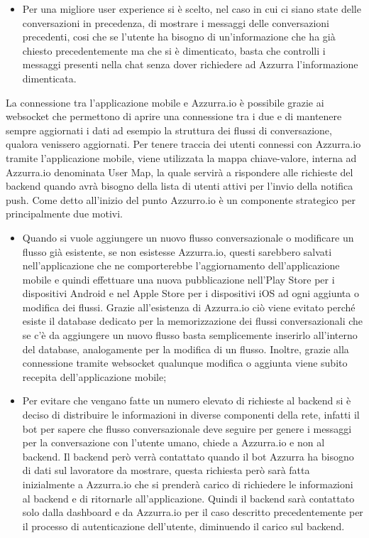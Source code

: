 \begin{trivlist}
\begin{itemize}
		\item Per una migliore user experience si è scelto, nel caso in cui ci siano state delle conversazioni in precedenza, di mostrare i messaggi delle conversazioni precedenti, cosi che se l'utente ha bisogno di un’informazione  che ha già chiesto precedentemente ma che si è dimenticato, basta che controlli i messaggi presenti nella chat senza dover richiedere ad Azzurra l'informazione dimenticata.
	\end{itemize}
	La connessione tra l'applicazione mobile e Azzurra.io è possibile grazie ai websocket che permettono di aprire una connessione tra i due e di mantenere sempre aggiornati i dati ad esempio la struttura dei flussi di conversazione, qualora venissero aggiornati. Per tenere traccia dei utenti connessi con Azzurra.io tramite l'applicazione mobile, viene utilizzata la mappa chiave-valore, interna ad Azzurra.io denominata User Map, la quale servirà a rispondere alle richieste del backend quando avrà bisogno della lista di utenti attivi per l'invio della notifica push. Come detto all'inizio del punto Azzurro.io è un componente strategico per principalmente due motivi.
	\begin{itemize}
		\item Quando si vuole aggiungere un nuovo flusso conversazionale o modificare un flusso già esistente, se non esistesse Azzurra.io, questi sarebbero salvati nell'applicazione che ne comporterebbe l'aggiornamento dell'applicazione mobile e quindi effettuare una nuova pubblicazione nell'Play Store per i dispositivi Android e nel Apple Store per i dispositivi iOS ad ogni aggiunta o modifica dei flussi. Grazie all'esistenza di Azzurra.io ciò viene evitato perché esiste il database dedicato per la memorizzazione dei flussi conversazionali che se c'è da aggiungere un nuovo flusso basta semplicemente inserirlo all'interno del database, analogamente per la modifica di un flusso. Inoltre, grazie alla connessione tramite websocket qualunque modifica o aggiunta viene subito recepita dell'applicazione mobile;
		\item Per evitare che vengano fatte un numero elevato di richieste al backend si è deciso di distribuire le informazioni in diverse componenti della rete, infatti il bot per sapere che flusso conversazionale deve seguire per genere i messaggi per la conversazione con l'utente umano, chiede a Azzurra.io e non al backend. Il backend però verrà contattato quando il bot Azzurra ha bisogno di dati sul lavoratore da mostrare, questa richiesta però sarà fatta inizialmente a Azzurra.io che si prenderà carico di richiedere le informazioni al backend e di ritornarle all'applicazione. Quindi il backend sarà contattato solo dalla dashboard e da Azzurra.io per il caso descritto precedentemente per il processo di autenticazione dell'utente, diminuendo il carico sul backend.
	\end{itemize}
	

\end{trivlist}
